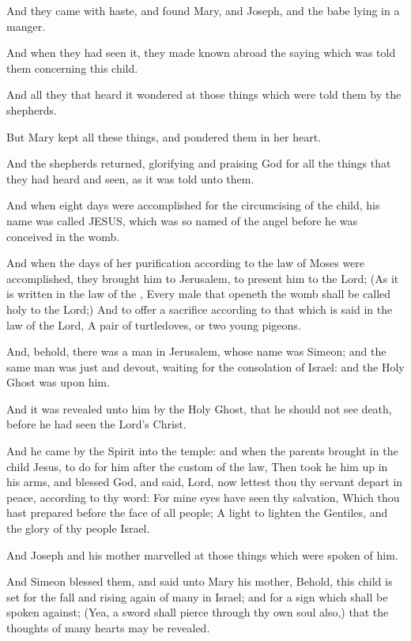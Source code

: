 \verse And they came with haste, and found Mary, and Joseph, and the babe lying in a manger.

\verse And when they had seen it, they made known abroad the saying which was told them concerning this child.

\verse And all they that heard it wondered at those things which were told them by the shepherds.

\verse But Mary kept all these things, and pondered them in her heart.

\verse And the shepherds returned, glorifying and praising God for all the things that they had heard and seen, as it was told unto them.

\verse And when eight days were accomplished for the circumcising of the child, his name was called JESUS, which was so named of the angel before he was conceived in the womb.

\verse And when the days of her purification according to the law of Moses were accomplished, they brought him to Jerusalem, to present him to the Lord; \verse (As it is written in the law of the \LORD, Every male that openeth the womb shall be called holy to the Lord;) \verse And to offer a sacrifice according to that which is said in the law of the Lord, A pair of turtledoves, or two young pigeons.

\verse And, behold, there was a man in Jerusalem, whose name was Simeon; and the same man was just and devout, waiting for the consolation of Israel: and the Holy Ghost was upon him.

\verse And it was revealed unto him by the Holy Ghost, that he should not see death, before he had seen the Lord's Christ.

\verse And he came by the Spirit into the temple: and when the parents brought in the child Jesus, to do for him after the custom of the law, \verse Then took he him up in his arms, and blessed God, and said, \verse Lord, now lettest thou thy servant depart in peace, according to thy word: \verse For mine eyes have seen thy salvation, \verse Which thou hast prepared before the face of all people; \verse A light to lighten the Gentiles, and the glory of thy people Israel.

\verse And Joseph and his mother marvelled at those things which were spoken of him.

\verse And Simeon blessed them, and said unto Mary his mother, Behold, this child is set for the fall and rising again of many in Israel; and for a sign which shall be spoken against; \verse (Yea, a sword shall pierce through thy own soul also,) that the thoughts of many hearts may be revealed.

